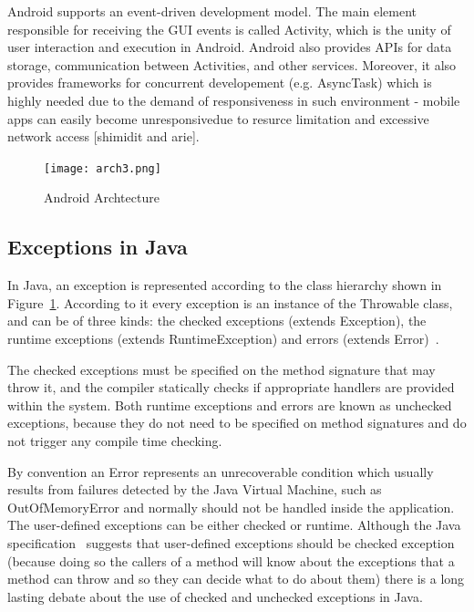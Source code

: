 \documentclass[conference]{IEEEtran}
\begin{document}
Android supports an event-driven development model. The main element responsible for 
receiving the GUI events is called Activity, which is the unity of user interaction and execution in
Android. Android also provides APIs for data storage, communication between Activities, 
and other services. Moreover, it also provides frameworks for concurrent developement (e.g. AsyncTask) 
which is highly needed due to the demand of responsiveness in such environment  - 
mobile apps can easily become unresponsivedue to resurce limitation and excessive
 network access [shimidit and arie].

\begin{figure} \centering \texttt{[image: arch3.png]}
  \caption{Android Archtecture} \label{fig:exchier} \end{figure}

\subsection{Exceptions in Java} \label{sec:extypes}

In Java, an exception is represented according to the class hierarchy shown in
Figure~\ref{fig:exchier}.  According to it every exception is an
instance of the Throwable class, and can be of three kinds: the checked exceptions
(extends Exception), the runtime exceptions (extends RuntimeException) and errors
(extends Error)~\cite{gosling2000java}. 

The checked exceptions must be specified on the method signature that may throw it, 
and the compiler statically checks if appropriate handlers are provided within the system.
Both runtime exceptions and errors are known as unchecked exceptions, because 
they do not need to be specified on method signatures and do not trigger any 
compile time checking.

By convention an Error represents an unrecoverable condition which usually results
from failures detected by the Java Virtual Machine, such as OutOfMemoryError and
normally should not be handled inside the application. The user-defined exceptions 
can be either checked or runtime. Although the Java specification~\cite{gosling2000java} 
suggests that user-defined exceptions should be checked exception (because doing so 
the callers of a method will know about the exceptions that a method can throw and so 
they can decide what to do about them) there is a long lasting debate about the use of 
checked and unchecked exceptions in Java. 
\end{document}
